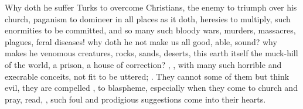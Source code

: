 {%

Why doth he suffer Turks to overcome Christians, the enemy to triumph
over his church, paganism to domineer in all places as it doth,
heresies to multiply, such enormities to be committed, and so many such
bloody wars, murders, massacres, plagues, feral diseases! why doth he
not make us all good, able, sound? why makes he venomous
creatures, rocks, sands, deserts, this earth itself the muck-hill of
the world, a prison, a house of correction? , \etc{}, with many such horrible and execrable conceits, not fit to
be uttered; . They cannot
some of them but think evil, they are compelled , to
blaspheme, especially when they come to church and pray, read, \etc{},
such foul and prodigious suggestions come into their hearts.

}
